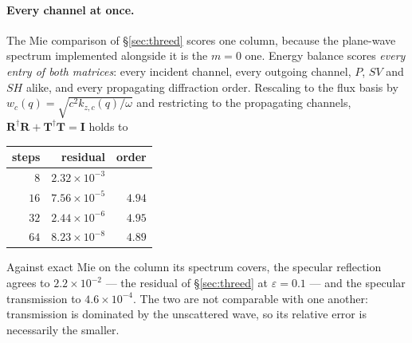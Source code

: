 \documentclass[11pt,a4paper]{article}
\newcommand{\bI}{\mathbf{I}}
\newcommand{\bT}{\mathbf{T}}
\newcommand{\bR}{\mathbf{R}}
\begin{document}
\paragraph{Every channel at once.}  The Mie comparison of \S\ref{sec:threed}
scores one column, because the plane-wave spectrum implemented alongside it is
the $m=0$ one.  Energy balance scores \emph{every entry of both matrices}:
every incident channel, every outgoing channel, $P$, $SV$ and $SH$ alike, and
every propagating diffraction order.  Rescaling to the flux basis by
$w_c(q)=\sqrt{c^{2}k_{z,c}(q)/\omega}$ and restricting to the propagating
channels, $\bR^{\dagger}\bR+\bT^{\dagger}\bT=\bI$ holds to

\begin{center}
\begin{tabular}{@{}rrr@{}}
\toprule
steps & residual & order\\
\midrule
$8$  & $2.32\times10^{-3}$ & \\
$16$ & $7.56\times10^{-5}$ & $4.94$\\
$32$ & $2.44\times10^{-6}$ & $4.95$\\
$64$ & $8.23\times10^{-8}$ & $4.89$\\
\bottomrule
\end{tabular}
\end{center}

\noindent
Against exact Mie on the column its spectrum covers, the specular reflection
agrees to $2.2\times10^{-2}$ --- the residual of \S\ref{sec:threed} at
$\varepsilon=0.1$ --- and the specular transmission to $4.6\times10^{-4}$.  The two are not comparable with one another: transmission
is dominated by the unscattered wave, so its relative error is necessarily the
smaller.
\end{document}
